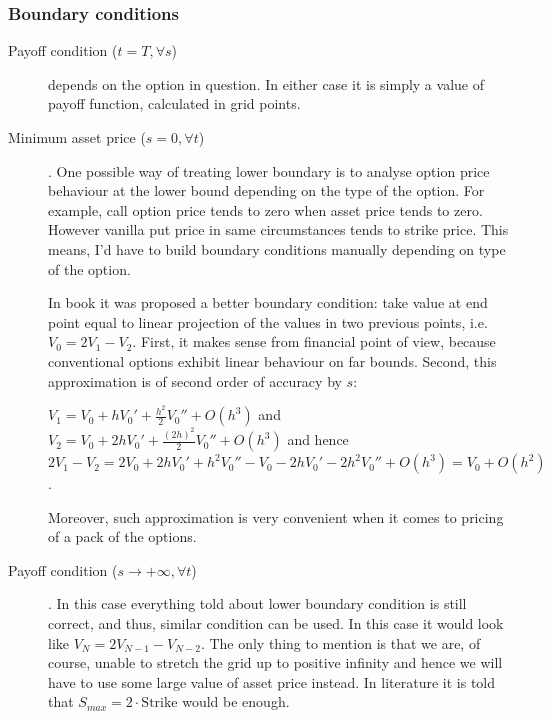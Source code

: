 \documentclass[11pt]{article} %
\begin{document}
\subsubsection{Boundary conditions}
\begin{description}
\item[Payoff condition ($t = T, \forall s$)] depends on the option in question. In either case it is simply a value of payoff function, calculated in grid points.
\item[Minimum asset price ($s = 0, \forall t$)]. One possible way of treating lower boundary is to analyse option price behaviour at the lower bound depending on the type of the option. For example, call option price tends to zero when asset price tends to zero. However vanilla put price in same circumstances tends to strike price. This means, I'd have to build boundary conditions manually depending on type of the option.

In book \cite[ch. ????]{PWoQF06} it was proposed a better boundary condition: take value at end point equal to linear projection of the values in two previous points, i.e. $V_0 = 2V_1 - V_2$. First, it makes sense from financial point of view, because conventional options exhibit linear behaviour on far bounds. Second, this approximation is of second order of accuracy by $s$:

$V_1 = V_0 + h V_0' + \frac{h^2}{2}V_0'' + O(h^3)$ and \\
$V_2 = V_0 + 2h V_0' + \frac{(2h)^2}{2}V_0'' + O(h^3)$ and hence \\
$2V_1 - V_2 = 2V_0 + 2h V_0' + h^2 V_0'' - V_0 - 2h V_0' - 2h^2V_0'' + O(h^3) = V_0 + O(h^2)$.

Moreover, such approximation is very convenient when it comes to pricing of a pack of the options. 

\item[Payoff condition ($s \to +\infty, \forall t$)]. In this case everything told about lower boundary condition is still correct, and thus, similar condition can be used. In this case it would look like $V_N = 2V_{N-1} - V_{N-2}$. The only thing to mention is that we are, of course, unable to stretch the grid up to positive infinity and hence we will have to use some large value of asset price instead. In literature it is told that $S_{max} = 2 \cdot \text{Strike}$ would be enough.  %
\end{description}
\end{document}

